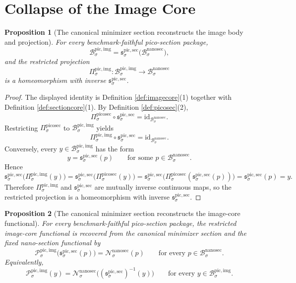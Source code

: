 \documentclass[11pt]{article}
\newcommand{\NanoSectionBody}[1]{\mathcal B_{#1}^{\mathrm{nanosec}}}
\newcommand{\NanoSectionFunctional}[1]{\mathscr N_{#1}^{\mathrm{nanosec}}}
\newcommand{\PicoSectionProj}[1]{\Pi_{#1}^{\mathrm{picosec}}}
\newcommand{\PicoImgBody}[1]{\mathcal B_{#1}^{\mathrm{pic,img}}}
\newcommand{\PicoImgProj}[1]{\Pi_{#1}^{\mathrm{pic,img}}}
\newcommand{\PicoImgFunctional}[1]{\mathscr P_{#1}^{\mathrm{pic,img}}}
\newcommand{\PicoMinSection}[1]{\mathfrak s_{#1}^{\mathrm{pic,sec}}}
\newtheorem{proposition}{Proposition}
\begin{document}
\section{Collapse of the Image Core}

\begin{proposition}[The canonical minimizer section reconstructs the image body and projection]
\label{prop:reconstructbody}
For every benchmark-faithful pico-section package,
\[
\PicoImgBody{\sigma}
=
\PicoMinSection{\sigma}\bigl(\NanoSectionBody{\sigma}\bigr),
\]
and the restricted projection
\[
\PicoImgProj{\sigma}:\PicoImgBody{\sigma}\to\NanoSectionBody{\sigma}
\]
is a homeomorphism with inverse \(\PicoMinSection{\sigma}\).
\end{proposition}

\begin{proof}
The displayed identity is Definition \ref{def:imagecore}(1) together with Definition \ref{def:sectioncore}(1). By Definition \ref{def:picosec}(2),
\[
\PicoSectionProj{\sigma}\circ\PicoMinSection{\sigma}
=
\mathrm{id}_{\NanoSectionBody{\sigma}}.
\]
Restricting \(\PicoSectionProj{\sigma}\) to \(\PicoImgBody{\sigma}\) yields
\[
\PicoImgProj{\sigma}\circ\PicoMinSection{\sigma}
=
\mathrm{id}_{\NanoSectionBody{\sigma}}.
\]
Conversely, every \(y\in\PicoImgBody{\sigma}\) has the form
\[
y=\PicoMinSection{\sigma}(p)
\qquad
\text{for some }
p\in\NanoSectionBody{\sigma}.
\]
Hence
\[
\PicoMinSection{\sigma}\bigl(\PicoImgProj{\sigma}(y)\bigr)
=
\PicoMinSection{\sigma}\bigl(\PicoSectionProj{\sigma}(y)\bigr)
=
\PicoMinSection{\sigma}\bigl(\PicoSectionProj{\sigma}(\PicoMinSection{\sigma}(p))\bigr)
=
\PicoMinSection{\sigma}(p)
=
y.
\]
Therefore \(\PicoImgProj{\sigma}\) and \(\PicoMinSection{\sigma}\) are mutually inverse continuous maps, so the restricted projection is a homeomorphism with inverse \(\PicoMinSection{\sigma}\).
\end{proof}

\begin{proposition}[The canonical minimizer section reconstructs the image-core functional]
\label{prop:reconstructfunctional}
For every benchmark-faithful pico-section package, the restricted image-core functional is recovered from the canonical minimizer section and the fixed nano-section functional by
\[
\PicoImgFunctional{\sigma}\bigl(\PicoMinSection{\sigma}(p)\bigr)
=
\NanoSectionFunctional{\sigma}(p)
\qquad
\text{for every }p\in\NanoSectionBody{\sigma}.
\]
Equivalently,
\[
\PicoImgFunctional{\sigma}(y)
=
\NanoSectionFunctional{\sigma}\bigl((\PicoMinSection{\sigma})^{-1}(y)\bigr)
\qquad
\text{for every }y\in\PicoImgBody{\sigma}.
\]
\end{proposition}
\end{document}

